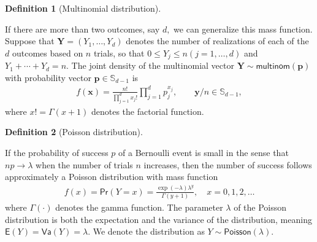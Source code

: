 \documentclass[
  11pt,
  letterpaper,
]{scrbook}
\theoremstyle{definition}
\theoremstyle{plain}
\theoremstyle{plain}
\theoremstyle{plain}
\theoremstyle{definition}
\theoremstyle{definition}
\newtheorem{definition}{Definition}[chapter]
\theoremstyle{plain}
\theoremstyle{plain}
\theoremstyle{remark}
\begin{document}
\begin{definition}[Multinomial
distribution]\protect\hypertarget{def-multinom-dist}{}\label{def-multinom-dist}

If there are more than two outcomes, say \(d,\) we can generalize this
mass function. Suppose that \(\boldsymbol{Y}=(Y_1, \ldots, Y_d)\)
denotes the number of realizations of each of the \(d\) outcomes based
on \(n\) trials, so that \(0 \leq Y_j \leq n (j=1, \ldots, d)\) and
\(Y_1 + \cdots + Y_d=n.\) The joint density of the multinomial vector
\(\boldsymbol{Y} \sim \mathsf{multinom}(\boldsymbol{p})\) with
probability vector \(\boldsymbol{p} \in \mathbb{S}_{d-1}\) is
\begin{align*}
f(\boldsymbol{x}) = \frac{n!}{\prod_{j=1}^d x_j!} \prod_{j=1}^d p_j^{x_j}, \qquad \boldsymbol{y}/n \in \mathbb{S}_{d-1},
\end{align*} where \(x! = \Gamma(x+1)\) denotes the factorial function.

\end{definition}

\begin{definition}[Poisson
distribution]\protect\hypertarget{def-poissondist}{}\label{def-poissondist}

If the probability of success \(p\) of a Bernoulli event is small in the
sense that \(np \to \lambda\) when the number of trials \(n\) increases,
then the number of success follows approximately a Poisson distribution
with mass function \begin{align*}
f(x)=\mathsf{Pr}(Y=x) = \frac{\exp(-\lambda)\lambda^y}{\Gamma(y+1)}, \quad x=0, 1, 2, \ldots
\end{align*} where \(\Gamma(\cdot)\) denotes the gamma function. The
parameter \(\lambda\) of the Poisson distribution is both the
expectation and the variance of the distribution, meaning
\(\mathsf{E}(Y)=\mathsf{Va}(Y)=\lambda.\) We denote the distribution as
\(Y \sim \mathsf{Poisson}(\lambda).\)

\end{definition}
\end{document}
